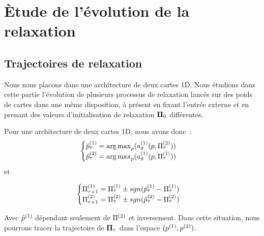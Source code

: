 \documentclass[../main]{subfiles}
\begin{document}
\section{\`Etude de l'évolution de la relaxation}

\subsection{Trajectoires de relaxation\label{sec:pf}}

Nous nous placons dans une architecture de deux cartes 1D.
Nous étudions dans cette partie l'évolution de plusieurs processus de relaxation lancés sur des poids de cartes dans une même disposition, à présent en fixant l'entrée externe et en prenant des valeurs d'initialisation de relaxation $\mathbf{\Pi}_0$ différentes.

Pour une architecture de deux cartes 1D, nous avons donc~:
\begin{equation*}
	\begin{cases}
	\hat{p}^{({1})}_\tau = \operatorname*{arg\,max}_p(a_g^{({1})}(p, \Pi^{({2})}_\tau))\\
	\hat{p}^{({2})}_\tau = \operatorname*{arg\,max}_p(a_g^{({1})}(p, \Pi^{({1})}_\tau)) \\
	\end{cases}
	\end{equation*}
et 

\begin{equation*}
	\begin{cases}
	\Pi^{({1})}_{\tau+1} = \Pi^{({1})}_\tau \pm sgn(\hat{p}^{({1})}_\tau - \Pi^{({1})}_\tau)  \\
	\Pi^{({2})}_{\tau+1} = \Pi^{({2})}_\tau \pm sgn(\hat{p}^{({2})}_\tau - \Pi^{({2})}_\tau) \\
	\end{cases}
	\end{equation*}

Avec $\hat{p}^{({1})}$ dépendant seulement de $\Pi^{({2})}$ et inversement. 
Dans cette situation, nous pourrons tracer la trajectoire de $\mathbf{\Pi}_\tau$ dans l'espace $(p^{({1})}, p^{({2})})$.
\end{document}
